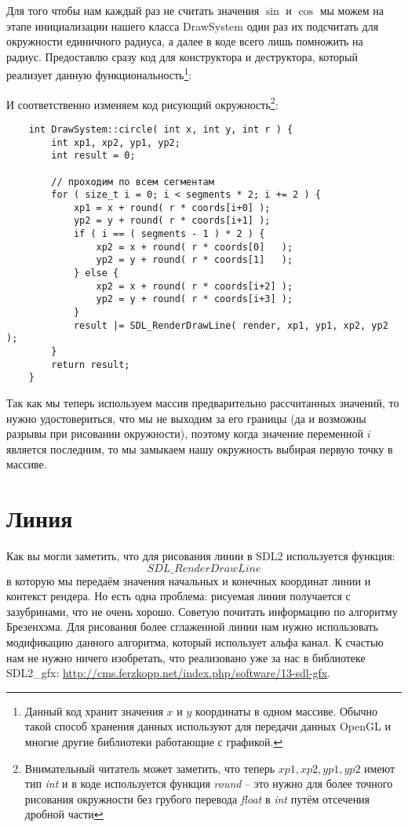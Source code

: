 Для того чтобы нам каждый раз не считать значения \( \sin \) и \( \cos \) мы можем на этапе инициализации 
нашего класса DrawSystem один раз их подсчитать для окружности единичного радиуса, а далее в коде всего лишь 
помножить на радиус. Предоставлю сразу код для конструктора и деструктора, который реализует данную 
функциональность\footnote{Данный код хранит значения \( x \) и \( y \) координаты в одном массиве. Обычно 
такой способ хранения данных используют для передачи данных OpenGL и многие другие библиотеки работающие с 
графикой.}:


\newpage

И соответственно изменяем код рисующий окружность\footnote{Внимательный читатель может заметить, что теперь 
\( xp1, xp2, yp1, yp2 \) имеют тип \emph{int} и в коде используется функция \emph{round} -- это нужно для 
более точного рисования окружности без грубого перевода \emph{float} в \emph{int} путём отсечения дробной 
части}:
\begin{lstlisting}
    int DrawSystem::circle( int x, int y, int r ) {
        int xp1, xp2, yp1, yp2;
        int result = 0;

        // проходим по всем сегментам
        for ( size_t i = 0; i < segments * 2; i += 2 ) {
            xp1 = x + round( r * coords[i+0] );
            yp2 = y + round( r * coords[i+1] );
            if ( i == ( segments - 1 ) * 2 ) {
                xp2 = x + round( r * coords[0]   );
                yp2 = y + round( r * coords[1]   );
            } else {
                xp2 = x + round( r * coords[i+2] );
                yp2 = y + round( r * coords[i+3] );
            }
            result |= SDL_RenderDrawLine( render, xp1, yp1, xp2, yp2 );
        }
        return result;
    }
\end{lstlisting}

Так как мы теперь используем массив предварительно рассчитанных значений, то нужно удостовериться, что мы 
не выходим за его границы (да и возможны разрывы при рисовании окружности), поэтому когда значение 
переменной \( i \) является последним, то мы замыкаем нашу окружность выбирая первую точку в массиве. 

\section{Линия}
Как вы могли заметить, что для рисования линии в SDL2 используется функция:
\[ 
    SDL\_RenderDrawLine 
\]
в которую мы передаём значения начальных и конечных координат линии и контекст рендера. Но есть одна 
проблема: рисуемая линия получается с зазубринами, что не очень хорошо. Советую почитать информацию по 
алгоритму Брезенхэма. Для рисования более сглаженной линии нам нужно использовать модификацию данного 
алгоритма, который использует альфа канал. К счастью нам не нужно ничего изобретать, что реализовано уже 
за нас в библиотеке SDL2\_gfx: \url{http://cms.ferzkopp.net/index.php/software/13-sdl-gfx}.

